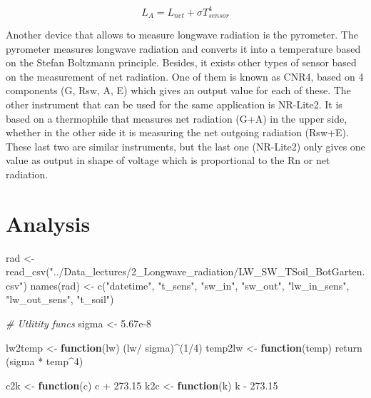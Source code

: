 \documentclass[
]{article}
\newenvironment{Shaded}{\begin{snugshade}}{\end{snugshade}}
\newcommand{\CommentTok}[1]{\textcolor[rgb]{0.56,0.35,0.01}{\textit{#1}}}
\newcommand{\ControlFlowTok}[1]{\textcolor[rgb]{0.13,0.29,0.53}{\textbf{#1}}}
\newcommand{\DecValTok}[1]{\textcolor[rgb]{0.00,0.00,0.81}{#1}}
\newcommand{\FloatTok}[1]{\textcolor[rgb]{0.00,0.00,0.81}{#1}}
\newcommand{\FunctionTok}[1]{\textcolor[rgb]{0.00,0.00,0.00}{#1}}
\newcommand{\NormalTok}[1]{#1}
\newcommand{\OtherTok}[1]{\textcolor[rgb]{0.56,0.35,0.01}{#1}}
\newcommand{\SpecialCharTok}[1]{\textcolor[rgb]{0.00,0.00,0.00}{#1}}
\newcommand{\StringTok}[1]{\textcolor[rgb]{0.31,0.60,0.02}{#1}}
\begin{document}
\[ L_A= L_{net} + \sigma T_{sensor}^4 \]

Another device that allows to measure longwave radiation is the
pyrometer. The pyrometer measures longwave radiation and converts it
into a temperature based on the Stefan Boltzmann principle. Besides, it
exists other types of sensor based on the measurement of net radiation.
One of them is known as CNR4, based on 4 components (G, Rsw, A, E) which
gives an output value for each of these. The other instrument that can
be used for the same application is NR-Lite2. It is based on a
thermophile that measures net radiation (G+A) in the upper side, whether
in the other side it is measuring the net outgoing radiation (Rsw+E).
These last two are similar instruments, but the last one (NR-Lite2) only
gives one value as output in shape of voltage which is proportional to
the Rn or net radiation.

\hypertarget{analysis}{%
\section{Analysis}\label{analysis}}

\begin{Shaded}
\begin{Highlighting}[]
\NormalTok{rad }\OtherTok{\textless{}{-}} \FunctionTok{read\_csv}\NormalTok{(}\StringTok{"../Data\_lectures/2\_Longwave\_radiation/LW\_SW\_TSoil\_BotGarten.csv"}\NormalTok{)}
\FunctionTok{names}\NormalTok{(rad) }\OtherTok{\textless{}{-}} \FunctionTok{c}\NormalTok{(}\StringTok{"datetime"}\NormalTok{, }\StringTok{"t\_sens"}\NormalTok{, }\StringTok{"sw\_in"}\NormalTok{, }\StringTok{"sw\_out"}\NormalTok{, }\StringTok{"lw\_in\_sens"}\NormalTok{, }\StringTok{"lw\_out\_sens"}\NormalTok{, }\StringTok{"t\_soil"}\NormalTok{)}
\end{Highlighting}
\end{Shaded}

\begin{Shaded}
\begin{Highlighting}[]
\CommentTok{\# Utlitity funcs}
\NormalTok{sigma }\OtherTok{\textless{}{-}} \FloatTok{5.67e{-}8} 

\NormalTok{lw2temp }\OtherTok{\textless{}{-}} \ControlFlowTok{function}\NormalTok{(lw) (lw}\SpecialCharTok{/}\NormalTok{ sigma)}\SpecialCharTok{\^{}}\NormalTok{(}\DecValTok{1}\SpecialCharTok{/}\DecValTok{4}\NormalTok{)}
\NormalTok{temp2lw }\OtherTok{\textless{}{-}} \ControlFlowTok{function}\NormalTok{(temp)  }\FunctionTok{return}\NormalTok{ (sigma }\SpecialCharTok{*}\NormalTok{ temp}\SpecialCharTok{\^{}}\DecValTok{4}\NormalTok{)}

\NormalTok{c2k }\OtherTok{\textless{}{-}} \ControlFlowTok{function}\NormalTok{(c) c }\SpecialCharTok{+} \FloatTok{273.15}
\NormalTok{k2c }\OtherTok{\textless{}{-}} \ControlFlowTok{function}\NormalTok{(k) k }\SpecialCharTok{{-}} \FloatTok{273.15}
\end{Highlighting}
\end{Shaded}
\end{document}
